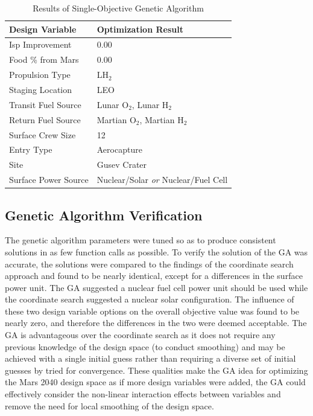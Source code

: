 \documentclass[]{aiaa-pretty}
\begin{document}
\begin{table}[h!]
	\centering
	\caption{Results of Single-Objective Genetic Algorithm}
	\label{tab:GAsingle}
	\begin{tabular}{ll}
	\textbf{Design Variable} & \textbf{Optimization Result}\\ \hline
	Isp Improvement & 0.00 \\
	Food \% from Mars & 0.00 \\
	Propulsion Type & LH$_2$ \\
	Staging Location & LEO \\
	Transit Fuel Source & Lunar O$_2$, Lunar H$_2$ \\
	Return Fuel Source & Martian O$_2$, Martian H$_2$ \\
	Surface Crew Size & 12\\
	Entry Type & Aerocapture \\
	Site & Gusev Crater \\
	Surface Power Source & Nuclear/Solar \textit{or} Nuclear/Fuel Cell\\
	\end{tabular}
\end{table}

\subsection{Genetic Algorithm Verification}
The genetic algorithm parameters were tuned so as to produce consistent solutions in as few function calls as possible. To verify the solution of the GA was accurate, the solutions were compared to the findings of the coordinate search approach and found to be nearly identical, except for a differences in the surface power unit. The GA suggested a nuclear fuel cell power unit should be used while the coordinate search suggested a nuclear solar configuration. The influence of these two design variable options on the overall objective value was found to be nearly zero, and therefore the differences in the two were deemed acceptable. The GA is advantageous over the coordinate search as it does not require any previous knowledge of the design space (to conduct smoothing) and may be achieved with a single initial guess rather than requiring a diverse set of initial guesses by tried for convergence. These qualities make the GA idea for optimizing the Mars 2040 design space as if more design variables were added, the GA could effectively consider the non-linear interaction effects between variables and remove the need for local smoothing of the design space.
\end{document}
